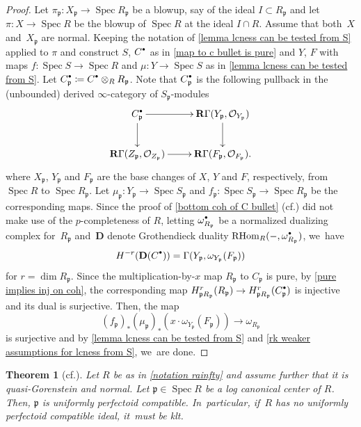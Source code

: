 \documentclass[11pt]{article}
\newcommand{\cf}{cf.\xspace}
\let\autoref\cref
\newcommand{\sbullet}{{\scriptscriptstyle\bullet}}
\newcommand{\csbullet}{{\raisebox{1pt}{$\sbullet$}}}
\theoremstyle{plain}
\newtheorem{theorem}{Theorem}[section]
\theoremstyle{definition}
\numberwithin{equation}{theorem}
\let\tensor\otimes
\newcommand{\p}{\mathfrak{p}}
\DeclareMathOperator{\RHom}{RHom}
\DeclareMathOperator{\Spec}{{Spec}}
\newcommand{\sO}{\mathcal{O}}
\newcommand{\rgamma}{\mathbf{R}\Gamma}
\begin{document}
\begin{proof}
Let $\pi_\p\colon X_\p\to \Spec R_\p$ be a blowup, say of the ideal $I\subset R_\p$ and let $\pi\colon X \to \Spec R$ be the blowup of $\Spec R$ at the ideal $I\cap R$. Assume that both~$X$ and~$X_\p$ are normal.
Keeping the notation of \autoref{lemma lcness can be tested from S} applied to $\pi$ and construct $S$, $C^\csbullet$ as in \autoref{map to c bullet is pure} and $Y$, $F$ with maps $f\colon \Spec S\to \Spec R$ and $\mu\colon Y\to \Spec S$
as in \autoref{lemma lcness can be tested from S}.
Let $C^\csbullet_\p\coloneqq C^\csbullet\tensor_R R_\p$. Note that $C^\csbullet_\p$ is the following pullback in the (unbounded) derived $\infty$-category of $S_\p$-modules
\[
\xymatrix{
C_\p^\csbullet \ar[d] \ar[r] & \rgamma(Y_\p,\sO_{Y_\p}) \ar[d] \\
\rgamma(Z_\p, \sO_{Z_\p}) \ar[r]& \rgamma(F_\p, \sO_{F_\p}).
}
\]
where $X_\p$, $Y_\p$ and $F_\p$ are the base changes of $X$, $Y$ and $F$, respectively, from $\Spec R$ to $\Spec R_\p$. Let $\mu_\p\colon Y_\p\to \Spec S_\p$ and $f_\p\colon \Spec S_\p \to \Spec R_\p$ be the corresponding maps.
Since the proof of \autoref{bottom coh of C bullet} (\cf \cite[Claim\,5.5]{BMPSTWWPerfectoidPure}) did not make use of the $p$-completeness of $R$, letting $\omega^\csbullet_{R_\p}$ be a normalized dualizing complex for~$R_\p$ and~$\mathbf{D}$ denote Grothendieck duality $\RHom_R(-,\omega^\csbullet_{R_\p})$, we~have
\[
H^{-r}(\mathbf{D}(C^\csbullet))=\Gamma(Y_\p,\omega_{Y_\p}(F_\p))
\]
for $r=\dim R_\p$.
Since the multiplication-by-$x$ map $R_\p$ to $C_\p$ is pure, by \autoref{pure implies inj on coh}, the corresponding map $H^r_{\p R_\p}(R_\p)\to H^r_{\p R_\p}(C^\csbullet_\p)$ is injective and its dual is surjective. Then, the map
\[
(f_\p)_* (\mu_\p)_*(x \cdot \omega_{Y_\p}(F_\p))\to \omega_{R_\p}
\]
is surjective and by \autoref{lemma lcness can be tested from S} and \autoref{rk weaker assumptions for lcness from S}, we~are done.
\end{proof}

\begin{theorem}[{\cf \cite[Th.\,6.7]{SchwedeCentersOfFPurity}}]\label{lc center is cpp for big enough A}
Let $R$ be as in \autoref{notation rainfty} and assume further that it is quasi-Gorenstein and normal. Let $\p\in \Spec R$ be a log canonical center of $R$. Then, $\p$ is uniformly perfectoid compatible. In~particular, if~$R$ has no uniformly perfectoid compatible ideal, it~must be klt.
\end{theorem}
\end{document}
